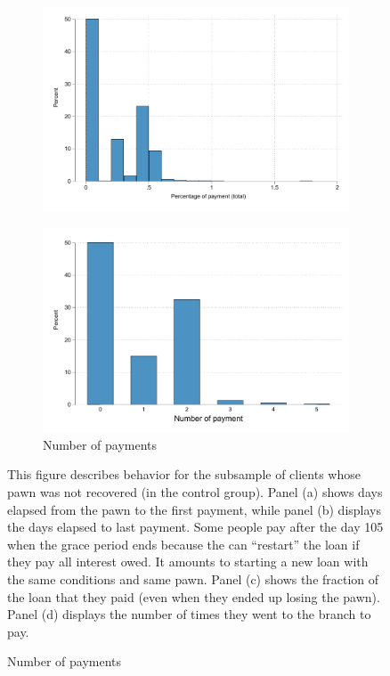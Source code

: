 \begin{figure}[H]
\begin{center}
\begin{subfigure}{0.40\textwidth}
        \centering
        \includegraphics[width=\textwidth]{Figuras/hist_percpay_default.pdf}
    \end{subfigure}
    \begin{subfigure}{0.40\textwidth}
        \caption{Number of payments}
        \centering
        \includegraphics[width=\textwidth]{Figuras/hist_numpay_default.pdf}
    \end{subfigure}
    \end{center}
        \scriptsize 
        This figure describes behavior for the subsample of clients whose pawn was not recovered (in the control group).  Panel (a) shows days elapsed from the pawn to the first payment, while panel (b) displays the days elapsed to last payment. Some people pay after the day 105 when the grace period ends because the can ``restart'' the loan if they pay all interest owed. It amounts to starting a new loan with the same conditions and same pawn. Panel (c) shows the fraction of the loan that they paid (even when they ended up losing the pawn). Panel (d) displays the number of times they went to the branch to pay.      
\end{figure}



